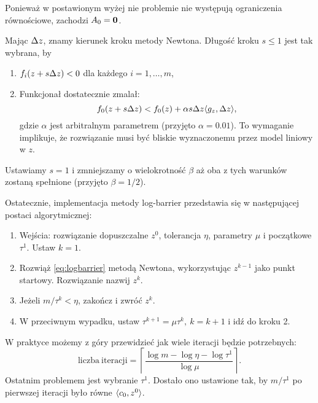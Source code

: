 Ponieważ w postawionym wyżej nie problemie nie występują ograniczenia równościowe, zachodzi $A_0=\mathbf{0}$. 

Mając $\Delta z$, znamy kierunek kroku metody Newtona. Długość kroku $s\leq 1$ jest tak wybrana, by
\begin{enumerate}
%
\item $f_i(z+s\Delta z) < 0$ dla każdego $i=1,\ldots,m$,
%
\item Funkcjonał dostatecznie zmalał:
\[
f_0(z+s\Delta z) < f_0(z) + \alpha s\Delta z \langle g_z,\Delta z\rangle,
\]
gdzie $\alpha$ jest arbitralnym parametrem (przyjęto $\alpha=0.01$).  To wymaganie implikuje, że rozwiązanie musi być bliskie wyznaczonemu przez model liniowy w $z$.
%
\end{enumerate}
Ustawiamy $s=1$ i zmniejszamy o wielokrotność $\beta$ aż oba z tych warunków zostaną spełnione (przyjęto $\beta = 1/2$).


Ostatecznie, implementacja metody log-barrier przedstawia się w następującej postaci algorytmicznej:
\begin{enumerate}
\item Wejścia: rozwiązanie dopuszczalne $z^0$, tolerancja $\eta$,  parametry $\mu$ i początkowe $\tau^1$.  Ustaw $k=1$.
\item Rozwiąż \eqref{eq:logbarrier} metodą Newtona, wykorzystując $z^{k-1}$ jako punkt startowy. Rozwiązanie nazwij $z^k$.
\item Jeżeli $m/\tau^k < \eta$, zakończ i zwróć $z^k$.
\item W przeciwnym wypadku, ustaw $\tau^{k+1} = \mu\tau^k,~k=k+1$ i idź do kroku 2.
\end{enumerate}
W praktyce możemy z góry przewidzieć jak wiele iteracji będzie potrzebnych:
\[
\mathrm{liczba~iteracji} = \left\lceil \frac{\log m - \log\eta -\log\tau^1}{\log\mu}\right\rceil.
\]
Ostatnim problemem jest wybranie $\tau^1$. Dostało ono ustawione tak, by $m/\tau^1$ po pierwszej iteracji było równe $\langle c_0,z^0\rangle$.